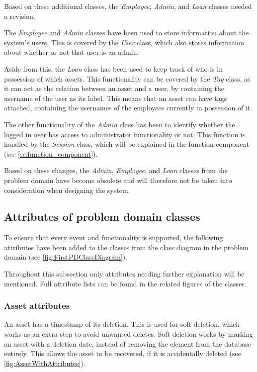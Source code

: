 Based on these additional classes, the \textit{Employee}, \textit{Admin}, and \textit{Loan} classes needed a revision.
\par
The \textit{Employee} and \textit{Admin} classes have been used to store information about the system's users. This is covered by the \textit{User} class, which also stores information about whether or not that user is an admin.
\par
Aside from this, the \textit{Loan} class has been used to keep track of who is in possession of which assets. This functionality can be covered by the \textit{Tag} class, as it can act as the relation between an asset and a user, by containing the username of the user as its label. This means that an asset can have tags attached, containing the usernames of the employees currently in possession of it.
\par
The other functionality of the \textit{Admin} class has been to identify whether the logged in user has access to administrator functionality or not. This function is handled by the \textit{Session} class, which will be explained in the function component (see \autoref{sc:function_component}).
\par
Based on these changes, the \textit{Admin}, \textit{Employee}, and \textit{Loan} classes from the problem domain have become obsolete and will therefore not be taken into consideration when designing the system.

\subsection{Attributes of problem domain classes}
To ensure that every event and functionality is supported, the following attributes have been added to the classes from the class diagram in the problem domain (see \autoref{fig:FirstPDClassDiagram}).
\par
Throughout this subsection only attributes needing further explanation will be mentioned. Full attribute lists can be found in the related figures of the classes.

\subsubsection{Asset attributes}
An asset has a timestamp of its deletion. This is used for soft deletion, which works as an extra step to avoid unwanted deletes. Soft deletion works by marking an asset with a deletion date, instead of removing the element from the database entirely. This allows the asset to be recovered, if it is accidentally deleted (see \autoref{fig:AssetWithAttributes}).

